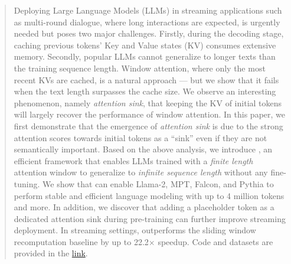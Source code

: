 \begin{abstract}
Deploying Large Language Models (LLMs) in streaming applications such as multi-round dialogue, where long interactions are expected, is urgently needed but poses two major challenges.
Firstly, during the decoding stage, caching previous tokens' Key and Value states (KV) consumes extensive memory.
Secondly, popular LLMs cannot generalize to longer texts than the training sequence length.
Window attention, where only the most recent KVs are cached, is a natural approach --- but we show that it fails when the text length surpasses the cache size.
We observe an interesting phenomenon, namely \emph{attention sink}, that keeping the KV of initial tokens will largely recover the performance of window attention. In this paper, we first demonstrate that the emergence of \emph{attention sink} is due to the strong attention scores towards initial tokens as a ``sink'' even if they are not semantically important.
Based on the above analysis, we introduce \method, an efficient framework that enables LLMs trained with a \textit{finite length} attention window to generalize to \textit{infinite sequence length} without any fine-tuning.
We show that \method can enable Llama-2, MPT, Falcon, and Pythia to perform stable and efficient language modeling with up to 4 million tokens and more.
In addition, we discover that adding a placeholder token as a dedicated attention sink during pre-training can further improve streaming deployment. In streaming settings, \method outperforms the sliding window recomputation baseline by up to 22.2$\times$ speedup.
Code and datasets are provided in the \href{https://github.com/mit-han-lab/streaming-llm}{link}.
\end{abstract}
